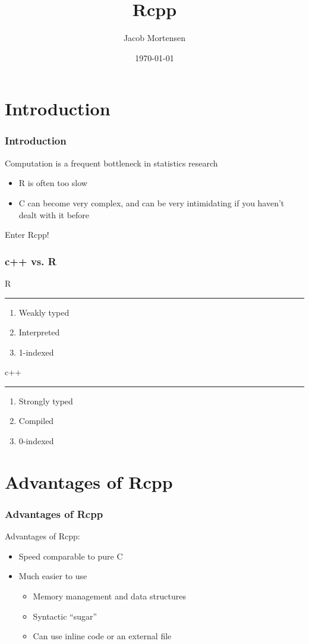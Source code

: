 \documentclass[10pt, compress]{beamer}
\title{Rcpp}
\date{\today}
\author{Jacob Mortensen}
\institute{Simon Fraser University}
\begin{document}
  \maketitle
  
  \section{Introduction}
  \begin{frame}
    \frametitle{Introduction}
    Computation is a frequent bottleneck in statistics research
    \begin{itemize}
      \item R is often too slow
      \item C can become very complex, and can be very intimidating if you haven't dealt with it before
    \end{itemize}
    Enter Rcpp!
  \end{frame}

  \begin{frame}
    \frametitle{c++ vs. R}
    \begin{minipage}{0.45\textwidth}
      \centering
      R
      \newline
      \hrule
      \begin{enumerate}
        \item Weakly typed
        \item Interpreted
        \item 1-indexed 
      \end{enumerate}
    \end{minipage}
    \hfill
    \vrule
    \hfill
    \begin{minipage}{0.45\textwidth}
      \centering
      c++
      \newline
      \hrule
      \begin{enumerate}
        \item Strongly typed
        \item Compiled
        \item 0-indexed
      \end{enumerate}
    \end{minipage}
  \end{frame}

  \section{Advantages of Rcpp}
  \begin{frame}
  \frametitle{Advantages of Rcpp}
  Advantages of Rcpp:
  \begin{itemize}
    \item Speed comparable to pure C
    \item Much easier to use
    \begin{itemize}
      \item Memory management and data structures
      \item Syntactic ``sugar''
      \item Can use inline code or an external file
    \end{itemize}
  \end{itemize}
  \end{frame}
\end{document}
